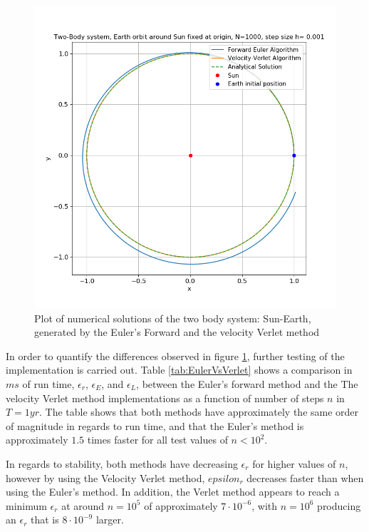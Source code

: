\documentclass[%
oneside,                 %
final,                   %
10pt]{article}
\begin{document}
\begin{figure}[!htb]
        \centering 
         \includegraphics[scale=.6]{../Results/twoBodyNOOplot1.png} 
        \caption{Plot of numerical solutions of the two body system: Sun-Earth, generated by the Euler's Forward and the velocity Verlet method}
        \label{fig:twobodyplot}   
\end{figure}  

In order to quantify the differences observed in figure \ref{fig:twobodyplot}, further testing of the implementation is carried out. Table \ref{tab:EulerVsVerlet} shows a comparison in $ms$ of run time, $\epsilon_r$, $\epsilon_E$, and $\epsilon_L$, between the Euler's forward method and the The velocity Verlet method implementations as a function of number of steps $n$ in $T=1 yr$. The table shows that both methods have approximately the same order of magnitude in regards to run time, and that the Euler's method is approximately $1.5$ times faster for all test values of $n <10^2$. \newline

In regards to stability, both methods have decreasing $\epsilon_r$ for higher values of $n$,  however by using the Velocity Verlet method, $epsilon_r$ decreases faster than when using the Euler's method. In addition, the Verlet method appears to reach a minimum $\epsilon_r$ at around $n=10^5$ of approximately $7\cdot 10^{-6}$, with $n=10^6$ producing an $\epsilon_r$ that is $8 \cdot 10^{-9}$ larger.\newline
\end{document}
